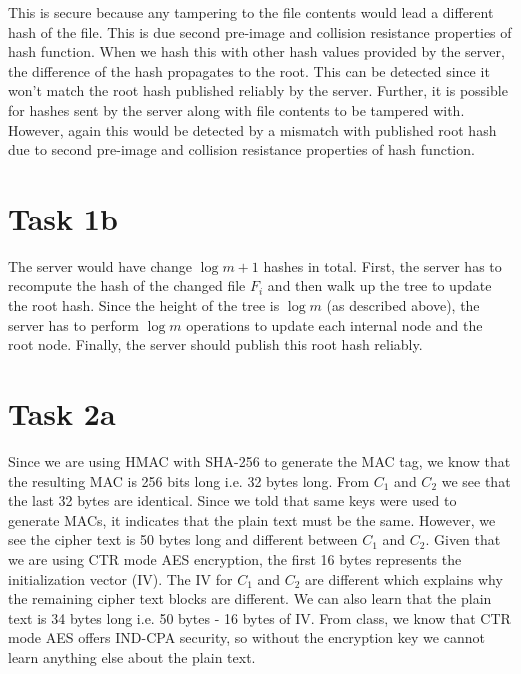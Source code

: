 \documentclass{article}
\begin{document}
    This is secure because any tampering to the file contents would lead a different hash of the file. This is due second pre-image and collision resistance properties of hash function. When we hash this with other hash values provided by the server, the difference of the hash propagates to the root. This can be detected since it won't match the root hash published reliably by the server. Further, it is possible for hashes sent by the server along with file contents to be tampered with. However, again this would be detected by a mismatch with published root hash due to second pre-image and collision resistance properties of hash function.

    \section*{Task 1b}
    The server would have change $\log m + 1$ hashes in total. First, the server has to recompute the hash of the changed file $F_i$ and then walk up the tree to update the root hash. Since the height of the tree is $\log m$ (as described above), the server has to perform $\log m$ operations to update each internal node and the root node. Finally, the server should publish this root hash reliably.

    \section*{Task 2a}
    Since we are using HMAC with SHA-256 to generate the MAC tag, we know that the resulting MAC is 256 bits long i.e. 32 bytes long. From $C_1$ and $C_2$ we see that the last 32 bytes are identical. Since we told that same keys were used to generate MACs, it indicates that the plain text must be the same. However, we see the cipher text is 50 bytes long and different between $C_1$ and $C_2$. Given that we are using CTR mode AES encryption, the first 16 bytes represents the initialization vector (IV). The IV for $C_1$ and $C_2$ are different which explains why the remaining cipher text blocks are different. We can also learn that the plain text is 34 bytes long i.e. 50 bytes - 16 bytes of IV. From class, we know that CTR mode AES offers IND-CPA security, so without the encryption key we cannot learn anything else about the plain text.
\end{document}
